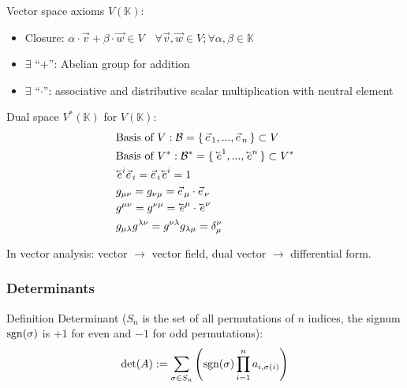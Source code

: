 			\noindent
			Vector space axioms $V(\mathbb{K})$:
			\begin{itemize}
				\item Closure: $\alpha \cdot \vec{v} + \beta \cdot \vec{w} \in V \quad \forall \vec{v}, \vec{w} \in V; \forall \alpha, \beta \in \mathbb{K}$
				\item $\exists$ ``$+$'': Abelian group for addition
				\item $\exists$ ``$\cdot$'': associative and distributive scalar multiplication with neutral element
			\end{itemize}

			\noindent
			Dual space $V^{*}(\mathbb{K})$ for $V(\mathbb{K})$:
			\begin{equation}
				\begin{aligned}
					&\text{Basis of $V$}: \mathcal{B} = \set{ \vec{e}_1,...,\vec{e}_n } \subset V \\
					&\text{Basis of $V^{*}$}: \mathcal{B}^{*} = \set{ \cev{e}^1,...,\cev{e}^n } \subset V^{*} \\
					&\cev{e}^i \vec{e}_i = \vec{e}_i \cev{e}^i = 1 \\
					&g_{\mu\nu} = g_{\nu\mu} = \vec{e}_\mu\cdot\vec{e}_\nu\\
					&g^{\mu\nu} = g^{\nu\mu} = \cev{e}^\mu\cdot\cev{e}^\nu \\
					&g_{\mu\lambda} g^{\lambda\nu} = g^{\nu\lambda}g_{\lambda\mu} = \delta_\mu^\nu \\
				\end{aligned}
			\end{equation}

			In vector analysis: vector $\rightarrow$ vector field, dual vector $\rightarrow$ differential form.

		\subsubsection{Determinants}
			Definition Determinant ($S_n$ is the set of all permutations of $n$ indices, the signum $\mathrm{sgn}(\sigma)$ is $+1$ for even and $-1$ for odd permutations):
			\begin{equation}
				\det(A) := \sum_{\sigma\in S_n}\qty(\mathrm{sgn}(\sigma)\prod_{i=1}^{n} a_{i,\sigma(i)})
			\end{equation}

